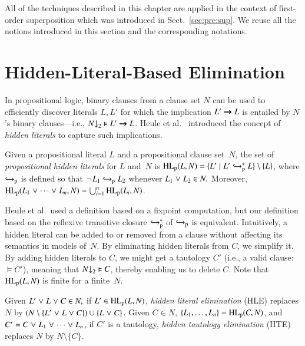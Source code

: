 All of the techniques described in this chapter are applied in the context of
first-order superposition which was introduced in Sect.~\ref{sec:pre:sup}. We
reuse all the notions introduced in this section and the corresponding notations. 

\section{Hidden-Literal-Based Elimination}
\label{sec:satfol:hidden-literal-based-elimination}

In propositional logic, binary clauses from a clause set $N$ can be used to
efficiently discover literals $L, L'$ for which the implication $L' \impl L$
is entailed by $N$'s binary clauses---i.e., $\binset{N} \models L' \impl L$.
Heule et al.\ \cite{hjb-2011-big-simplification} introduced the concept of \emph{hidden
literals} to capture such implications.

\begin{defi}
   Given a propositional literal $L$ and a propositional clause set~$N$, the
   set of \emph{propositional hidden literals} for $L$ and~$N$ is
   $\PHL(L, N) = \{ L' \mid L' \bigpimpl{N}^\ast L \} \setminus \{ L \}$, where $\bigpimpl{N}$ is
   defined so that $\neglit{L_1} \bigpimpl{N} L_2$ whenever $L_1 \cor L_2 \in N.$
   Moreover, $\PHL(L_1 \cor \cdots \cor L_n, N) = \bigcup_{i=1}^n
   \PHL(L_i, N)$.
\end{defi}

Heule et al.\ used a definition based on a fixpoint computation, but our
definition based on the reflexive transitive closure $\bigpimpl{N}^\ast$ of $\bigpimpl{N}$ is equivalent. Intuitively,
a hidden literal can be added to or removed from a clause without affecting its
semantics in models of~$N.$ By eliminating hidden literals from $C$, we simplify
it. By adding hidden literals to $C$, we might get a tautology $C'$ (i.e., a
valid clause:\ $\models C'$), meaning that $\binset{N} \models C$, thereby
enabling us to delete $C$. Note that $\PHL(L,N)$ is finite for a finite~$N.$

\begin{defi}
   \label{def:hle}\label{def:hte}
   Given $L' \cor L \cor C \in N,$ if $L' \in
   \PHL(L, N)$, \emph{hidden literal elimination} (HLE) replaces $N$ by $(N
   \setminus \{L' \cor L \cor C\}) \cup \{L \cor C\}$.
   Given $C \in N$, $\{L_1,\dots,L_n\} = \PHL(C, N)$, and $C' = C \cor L_1 \cor
   \cdots \cor L_n$, if $C'$ is a tautology, \emph{hidden
   tautology elimination} (HTE) replaces $N$ by $N \setminus \{C\}$.
\end{defi}

